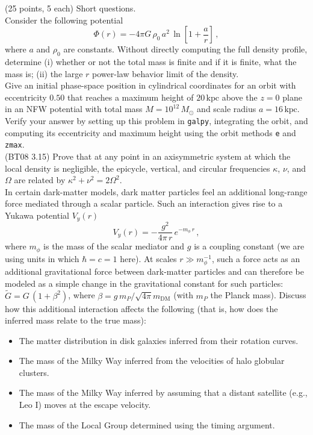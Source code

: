 \documentclass[12pt]{article}
\begin{document}
 (25 points, 5 each) Short questions.\\

 Consider the following potential
\begin{equation}
  \Phi(r) = -4\pi G\,\rho_0\,a^2\,\ln\left[1+\frac{a}{r}\right]\,,
\end{equation}
where $a$ and $\rho_0$ are constants. Without directly computing the
full density profile, determine (i) whether or not the total mass is
finite and if it is finite, what the mass is; (ii) the large $r$
power-law behavior limit of the density.\\

 Give an initial phase-space position in cylindrical
coordinates for an orbit with eccentricity $0.50$ that reaches a
maximum height of $20\,\mathrm{kpc}$ above the $z=0$ plane in an NFW
potential with total mass $M = 10^{12}\,M_\odot$ and scale radius $a =
16\,\mathrm{kpc}$. Verify your answer by setting up this problem in
\texttt{galpy}, integrating the orbit, and computing its eccentricity
and maximum height using the orbit methods \texttt{e} and
\texttt{zmax}.\\

 (BT08 3.15) Prove that at any point in an
axisymmetric system at which the local density is negligible, the
epicycle, vertical, and circular frequencies $\kappa$, $\nu$, and
$\Omega$ are related by $\kappa^2+\nu^2 = 2\Omega^2$.\\

 In certain dark-matter models, dark matter
particles feel an additional long-range force mediated through a
scalar particle. Such an interaction gives rise to a Yukawa
potential $V_y(r)$
\begin{equation}
  V_y(r) = -\frac{g^2}{4\pi\,r}\,e^{-m_\phi\,r}\,,
\end{equation}
where $m_\phi$ is the mass of the scalar mediator and $g$ is a
coupling constant (we are using units in which $\hbar = c = 1$
here). At scales $r \gg m_\phi^{-1}$, such a force acts as an
additional gravitational force between dark-matter particles and can
therefore be modeled as a simple change in the gravitational constant
for such particles: $\tilde{G} = G\,(1+\beta^2)$, where $\beta =
g\,m_P/\sqrt{4\pi}m_{\mathrm{DM}}$ (with $m_P$ the Planck
mass). Discuss how this additional interaction affects the following
(that is, how does the inferred mass relate to the true mass):

\begin{itemize}
\item The matter distribution in disk galaxies inferred from their
  rotation curves.
\item The mass of the Milky Way inferred from the velocities of halo globular clusters.
\item The mass of the Milky Way inferred by assuming that a distant satellite (e.g., Leo I) moves at the escape velocity.
\item The mass of the Local Group determined using the timing
  argument.
\end{itemize}
\end{document}
